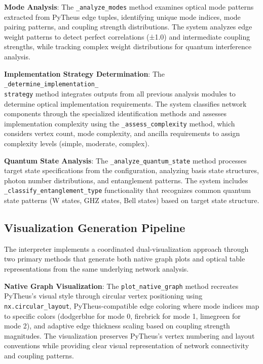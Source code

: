 \documentclass[11pt,a4paper]{article}
\begin{document}
\textbf{Mode Analysis}: The \texttt{\_analyze\_modes} method examines optical mode patterns extracted from PyTheus edge tuples, identifying unique mode indices, mode pairing patterns, and coupling strength distributions. The system analyzes edge weight patterns to detect perfect correlations (±1.0) and intermediate coupling strengths, while tracking complex weight distributions for quantum interference analysis.

\textbf{Implementation Strategy Determination}: The \texttt{\_determine\_implementation\_\\strategy} method integrates outputs from all previous analysis modules to determine optical implementation requirements. The system classifies network components through the specialized identification methods and assesses implementation complexity using the \texttt{\_assess\_complexity} method, which considers vertex count, mode complexity, and ancilla requirements to assign complexity levels (simple, moderate, complex).

\textbf{Quantum State Analysis}: The \texttt{\_analyze\_quantum\_state} method processes target state specifications from the configuration, analyzing basis state structures, photon number distributions, and entanglement patterns. The system includes \texttt{\_classify\_entanglement\_type} functionality that recognizes common quantum state patterns (W states, GHZ states, Bell states) based on target state structure.

\subsection{Visualization Generation Pipeline}

The interpreter implements a coordinated dual-visualization approach through two primary methods that generate both native graph plots and optical table representations from the same underlying network analysis.

\textbf{Native Graph Visualization}: The \texttt{plot\_native\_graph} method recreates PyTheus's visual style through circular vertex positioning using \texttt{nx.circular\_layout}, PyTheus-compatible edge coloring where mode indices map to specific colors (dodgerblue for mode 0, firebrick for mode 1, limegreen for mode 2), and adaptive edge thickness scaling based on coupling strength magnitudes. The visualization preserves PyTheus's vertex numbering and layout conventions while providing clear visual representation of network connectivity and coupling patterns.
\end{document}
